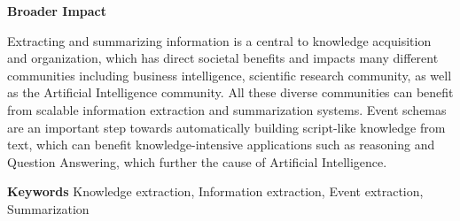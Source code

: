 

{\bf Broader Impact} 

Extracting and summarizing information is a central to knowledge acquisition and organization, which has direct societal benefits and impacts many different communities including business intelligence, scientific research community, as well as the Artificial Intelligence community. All these diverse communities can benefit from scalable information extraction and summarization systems. Event schemas are an important step towards automatically building script-like knowledge from text, which can benefit knowledge-intensive applications such as reasoning and Question Answering, which further the cause of Artificial Intelligence. 

{\bf Keywords} Knowledge extraction, Information extraction, Event extraction, Summarization

%
